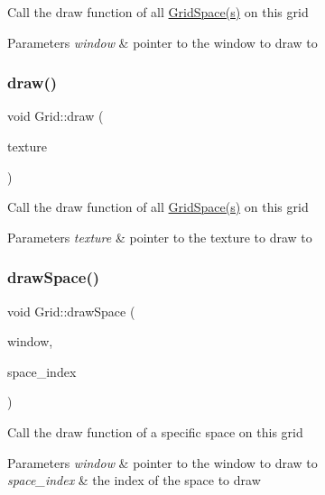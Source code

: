 Call the draw function of all \hyperlink{classGridSpace}{Grid\+Space(s)} on this grid


\begin{DoxyParams}{Parameters}
{\em window} & pointer to the window to draw to \\
\hline
\end{DoxyParams}
\mbox{\label{classGrid_aba72dde0bcafe22ad1ac4ef11437d758}} 
\subsubsection{\texorpdfstring{draw()}{draw()}\hspace{0.1cm}{\footnotesize\ttfamily [2/2]}}
{\footnotesize\ttfamily void Grid\+::draw (\begin{DoxyParamCaption}\item[{sf\+::\+Render\+Texture \&}]{texture }\end{DoxyParamCaption})}

Call the draw function of all \hyperlink{classGridSpace}{Grid\+Space(s)} on this grid


\begin{DoxyParams}{Parameters}
{\em texture} & pointer to the texture to draw to \\
\hline
\end{DoxyParams}
\mbox{\label{classGrid_a4b521f4c9a986643de4bc78ca734f121}} 
\subsubsection{\texorpdfstring{draw\+Space()}{drawSpace()}}
{\footnotesize\ttfamily void Grid\+::draw\+Space (\begin{DoxyParamCaption}\item[{sf\+::\+Render\+Window \&}]{window,  }\item[{int}]{space\+\_\+index }\end{DoxyParamCaption})}

Call the draw function of a specific space on this grid


\begin{DoxyParams}{Parameters}
{\em window} & pointer to the window to draw to \\
\hline
{\em space\+\_\+index} & the index of the space to draw \\
\hline
\end{DoxyParams}
\mbox{\label{classGrid_a47e4cb0f73060c1b6d23f6d31182b6c1}} 
